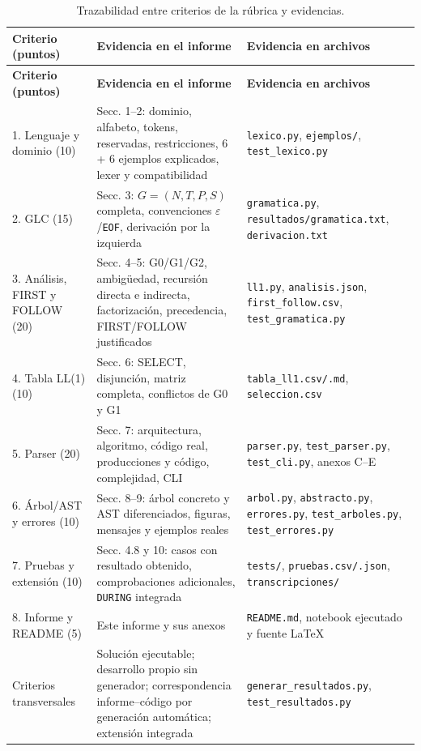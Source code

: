 \documentclass[11pt,letterpaper]{article}
\newcommand{\cod}[1]{\texttt{#1}}
\newcommand{\ruta}[1]{\nolinkurl{#1}}
\newcommand{\T}[1]{\texttt{#1}}
\newcommand{\cabeza}{\rowcolor{cabecera}}
\begin{document}
\begin{longtable}{>{\raggedright}p{3.6cm}>{\raggedright}p{6.4cm}>{\raggedright\arraybackslash}p{5.6cm}}
\caption{Trazabilidad entre criterios de la rúbrica y evidencias.}\\
\hline\cabeza \textbf{Criterio (puntos)} & \textbf{Evidencia en el informe} & \textbf{Evidencia en archivos}\\\hline\endfirsthead
\hline\cabeza \textbf{Criterio (puntos)} & \textbf{Evidencia en el informe} & \textbf{Evidencia en archivos}\\\hline\endhead
1. Lenguaje y dominio (10) & Secc. 1--2: dominio, alfabeto, tokens, reservadas, restricciones, 6 + 6 ejemplos explicados,
lexer y compatibilidad & \cod{lexico.py}, \ruta{ejemplos/}, \ruta{test_lexico.py}\\
2. GLC (15) & Secc. 3: $G=(N,T,P,S)$ completa, convenciones $\varepsilon$/\T{EOF}, derivación por la izquierda &
\cod{gramatica.py}, \ruta{resultados/gramatica.txt}, \cod{derivacion.txt}\\
3. Análisis, FIRST y FOLLOW (20) & Secc. 4--5: G0/G1/G2, ambigüedad, recursión directa e indirecta, factorización,
precedencia, FIRST/FOLLOW justificados & \cod{ll1.py}, \cod{analisis.json}, \ruta{first_follow.csv},
\ruta{test_gramatica.py}\\
4. Tabla LL(1) (10) & Secc. 6: SELECT, disjunción, matriz completa, conflictos de G0 y G1 & \ruta{tabla_ll1.csv/.md},
\cod{seleccion.csv}\\
5. Parser (20) & Secc. 7: arquitectura, algoritmo, código real, producciones y código, complejidad, CLI &
\cod{parser.py}, \ruta{test_parser.py}, \ruta{test_cli.py}, anexos C--E\\
6. Árbol/AST y errores (10) & Secc. 8--9: árbol concreto y AST diferenciados, figuras, mensajes y ejemplos reales &
\cod{arbol.py}, \cod{abstracto.py}, \cod{errores.py}, \ruta{test_arboles.py}, \ruta{test_errores.py}\\
7. Pruebas y extensión (10) & Secc. 4.8 y 10: \NumCasos{} casos con resultado obtenido, comprobaciones adicionales,
\T{DURING} integrada & \ruta{tests/}, \ruta{pruebas.csv/.json}, \ruta{transcripciones/}\\
8. Informe y README (5) & Este informe y sus anexos & \cod{README.md}, notebook ejecutado y
fuente LaTeX\\
Criterios transversales & Solución ejecutable; desarrollo propio sin generador; correspondencia informe--código por
generación automática; extensión integrada & \ruta{generar_resultados.py}, \ruta{test_resultados.py}\\\hline
\end{longtable}
\end{document}
